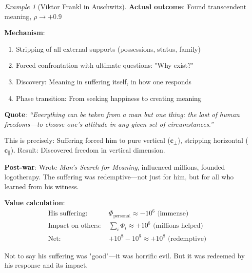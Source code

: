 \documentclass[11pt,a4paper]{article}
\theoremstyle{definition}
\theoremstyle{remark}
\newtheorem{example}{Example}[section]
\newcommand{\cc}{\mathbf{c}}
\begin{document}
\begin{enumerate}
\begin{example}[Viktor Frankl in Auschwitz]
\textbf{Actual outcome}: Found transcendent meaning, \(\rho \to +0.9\)

\textbf{Mechanism}:
\begin{enumerate}
    \item Stripping of all external supports (possessions, status, family)
    \item Forced confrontation with ultimate questions: "Why exist?"
    \item Discovery: Meaning in suffering itself, in how one responds
    \item Phase transition: From seeking happiness to creating meaning
\end{enumerate}

\textbf{Quote}: \textit{``Everything can be taken from a man but one thing: the last of human freedoms—to choose one's attitude in any given set of circumstances.''}

This is precisely: Suffering forced him to pure vertical (\(\cc_\perp\)), stripping horizontal (\(\cc_\parallel\)). Result: Discovered freedom in vertical dimension.

\textbf{Post-war}: Wrote \textit{Man's Search for Meaning}, influenced millions, founded logotherapy. The suffering was redemptive—not just for him, but for all who learned from his witness.

\textbf{Value calculation}:
\begin{align}
\text{His suffering: } &\Phi_{\text{personal}} \approx -10^6 \text{ (immense)} \\
\text{Impact on others: } &\sum_i \Phi_i \approx +10^8 \text{ (millions helped)} \\
\text{Net: } &+10^8 - 10^6 \approx +10^8 \text{ (redemptive)}
\end{align}

Not to say his suffering was "good"—it was horrific evil. But it was redeemed by his response and its impact.
\end{example}

\begin{figure}[H]
\centering
{}
\end{figure}
\end{enumerate}
\end{document}
